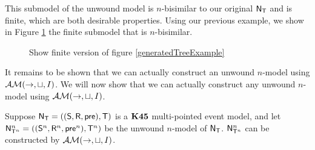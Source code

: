 This submodel of the unwound model is $n$-bisimilar to our original $\mathrm{\mathsf{N}}_\mathrm{\mathsf{T}}$
and is finite, which are both desirable properties.
Using our previous example, we show in Figure \ref{genSubtreeExample} the
finite submodel that is $n$-bisimilar.

\begin{figure}[ht!]
\centering
\caption{\FIXME Show finite version of figure \ref{generatedTreeExample}} \label{genSubtreeExample}
\end{figure}

It remains to be shown that we can actually construct an unwound $n$-model using
$\mathcal{AM}(\to,\sqcup,I)$.
We will now show that we can actually construct any unwound $n$-model using $\mathcal{AM}(\to,
\sqcup, I)$.

\begin{lemma} \label{unwoundNModelGenerated}
  Suppose $\mathrm{\mathsf{N}}_\mathrm{\mathsf{T}} = ((\mathrm{\mathsf{S}},\mathrm{\mathsf{R}},\mathrm{\mathsf{pre}}),\mathrm{\mathsf{T}})$ is a $\bf K45$ multi-pointed
  event model, and let $\mathrm{\mathsf{N}}^n_{\mathrm{\mathsf{T}}^n} = ((\mathrm{\mathsf{S}}^n, \mathrm{\mathsf{R}}^n, \mathrm{\mathsf{pre}}^n),\mathrm{\mathsf{T}}^n)$ be the
  unwound $n$-model of $\mathrm{\mathsf{N}}_\mathrm{\mathsf{T}}$.
  $\mathrm{\mathsf{N}}^n_{\mathrm{\mathsf{T}}^n}$ can be constructed by $\mathcal{AM}(\to, \sqcup, I)$.
\end{lemma}
